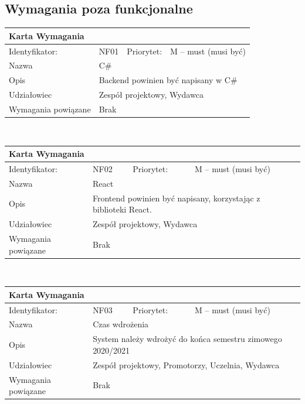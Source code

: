 \documentclass[a4paper,11pt]{report}
\begin{document}
	\subsection {Wymagania poza funkcjonalne}
	\begin{tabular}{|p{3cm}|p{2cm}|p{2cm}|p{6cm}|}
		\hline
		\multicolumn{4}{|p{12 cm}|}{Karta Wymagania}\\
		\hline
		Identyfikator: & NF01 & Priorytet: & M – must (musi być)\\
		\hline
		Nazwa & \multicolumn{3}{|p{10 cm}|}{C\#}\\
		\hline
		Opis & \multicolumn{3}{|p{10 cm}|}{Backend powinien być napisany w C\#}\\
		\hline
		Udziałowiec & \multicolumn{3}{|p{10 cm}|}{Zespół projektowy, Wydawca}\\
		\hline
		Wymagania powiązane & \multicolumn{3}{|p{10 cm}|}{Brak}\\
		\hline
		\end{tabular}\\
		\newline
		\vspace*{0,2 cm}
		\newline
		\begin{tabular}{|p{3cm}|p{2cm}|p{2cm}|p{6cm}|}
		\hline
		\multicolumn{4}{|p{12 cm}|}{Karta Wymagania}\\
		\hline
		Identyfikator: & NF02 & Priorytet: & M – must (musi być)\\
		\hline
		Nazwa & \multicolumn{3}{|p{10 cm}|}{React}\\
		\hline
		Opis & \multicolumn{3}{|p{10 cm}|}{Frontend powinien być napisany, korzystając z biblioteki React.}\\
		\hline
		Udziałowiec & \multicolumn{3}{|p{10 cm}|}{Zespół projektowy, Wydawca}\\
		\hline
		Wymagania powiązane & \multicolumn{3}{|p{10 cm}|}{Brak}\\
		\hline
		\end{tabular}\\
		\newline
		\vspace*{0,2 cm}
		\newline
		\begin{tabular}{|p{3cm}|p{2cm}|p{2cm}|p{6cm}|}
		\hline
		\multicolumn{4}{|p{12 cm}|}{Karta Wymagania}\\
		\hline
		Identyfikator: & NF03 & Priorytet: & M – must (musi być)\\
		\hline
		Nazwa & \multicolumn{3}{|p{10 cm}|}{Czas wdrożenia}\\
		\hline
		Opis & \multicolumn{3}{|p{10 cm}|}{System należy wdrożyć do końca semestru zimowego 2020/2021}\\
		\hline
		Udziałowiec & \multicolumn{3}{|p{10 cm}|}{Zespół projektowy, Promotorzy, Uczelnia, Wydawca}\\
		\hline
		Wymagania powiązane & \multicolumn{3}{|p{10 cm}|}{Brak}\\
		\hline
		\end{tabular}\\
\end{document}
